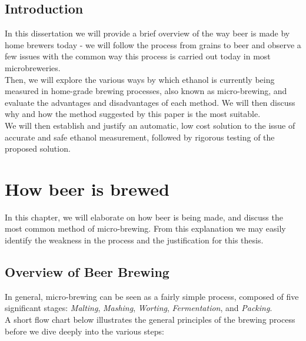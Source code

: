 \documentclass[twoside]{ctuthesis}
\theoremstyle{plain}
\theoremstyle{definition}
\theoremstyle{note}
\begin{document}
\maketitle

\section{Introduction}

In this dissertation we will provide a brief overview of the way beer is made by home brewers today - we will follow the process from grains to beer and observe a few issues with the common way this process is carried out today in most microbreweries.\\
Then, we will explore the various ways by which ethanol is currently being measured in home-grade brewing processes, also known as micro-brewing, and evaluate the advantages and disadvantages of each method. We will then discuss why and how the method suggested by this paper is the most suitable.\\
We will then establish and justify an automatic, low cost solution to the issue of accurate and safe ethanol measurement, followed by rigorous testing of the proposed solution.

\chapter{How beer is brewed}

In this chapter, we will elaborate on how beer is being made, and discuss the most common method of micro-brewing.
From this explanation we may easily identify the weakness in the process and the justification for this thesis.

\section{Overview of Beer Brewing}
In general, micro-brewing can be seen as a fairly simple process, composed of five significant stages: \textit{Malting}, \textit{Mashing}, \textit{Worting}, \textit{Fermentation}, and \textit{Packing}.\\
A short flow chart below illustrates the general principles of the brewing process before we dive deeply into the various steps:
\end{document}

